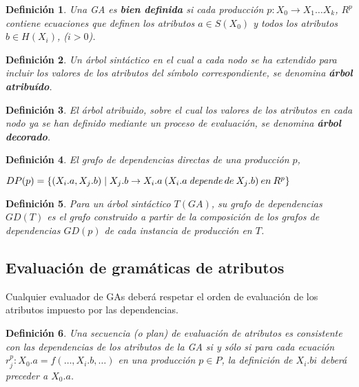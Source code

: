 \documentclass[a4paper]{article}
\newtheorem{definition}{Definición}[section]
\begin{document}
\begin{definition}
Una GA es \textbf{bien definida} si cada producción $p:X_0 \rightarrow X_1 \ldots X_k$, $R^p$ 
contiene ecuaciones que definen los atributos $a \in S(X_0)$ y todos los atributos 
$b \in H(X_i)$, ($i > 0$).
\end{definition}

\begin{definition}
Un árbol sintáctico en el cual a cada nodo se ha extendido para incluir los valores de los
atributos del símbolo correspondiente, se denomina \textbf{árbol atribuído}.
\end{definition}

\begin{definition} 
\label{def:ast-attr}
El árbol atribuido, sobre el cual los valores de los atributos en cada nodo ya se han definido mediante un proceso de evaluación, se denomina \textbf{árbol decorado}.
\end{definition}

\begin{definition} El grafo de dependencias directas de una producción $p$,

$DP(p) = \{(X_{i}.a,X_{j}.b) \mid X_{j}.b \rightarrow X_{i}.a \:
(X_{i}.a \: \emph{depende} \: de \: X_{j}.b) \: en \: R^{p}\} $ 
\end{definition}

\begin{definition} Para un árbol sintáctico $T(GA)$, su grafo de dependencias 
$GD(T)$ es el grafo construido a partir de la composición de los grafos de dependencias 
$GD(p)$ de cada instancia de producción en $T$.
\end{definition}

\subsection{Evaluación de gramáticas de atributos}
\label{sec:eval}

Cualquier evaluador de GAs deberá respetar el orden de evaluación de los atributos impuesto
por las dependencias.

\begin{definition}
Una secuencia (o plan) de evaluación de atributos es consistente con las dependencias de los atributos de la GA si y sólo si para cada ecuación $r_{j}^{p} : X_{0}.a = f(\ldots, X_{i}.b, \ldots)$ 
en una producción $p \in P$, la definición de $X_{i}.b{i}$ deberá preceder a $X_{0}.a$.
\end{definition}
\end{document}
